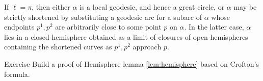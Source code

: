 If $\ell=\pi$, then either $\alpha$ is a local geodesic, and hence a great circle, 
or $\alpha$ may be strictly shortened by substituting a geodesic arc for a subarc of $\alpha$ 
whose endpoints $p^1,p^2$ are arbitrarily close to some point $p$ on  $\alpha$.
In the latter case,  $\alpha$ lies in a closed hemisphere obtained as a limit of closures of open hemispheres  containing the shortened curves as $p^1,p^2$ approach $p$.
\qeds




\begin{thm}{Exercise}\label{exr-crofton}
Build a proof of Hemisphere lemma
\ref{lem:hemisphere} based on Crofton's formula.
\end{thm}







